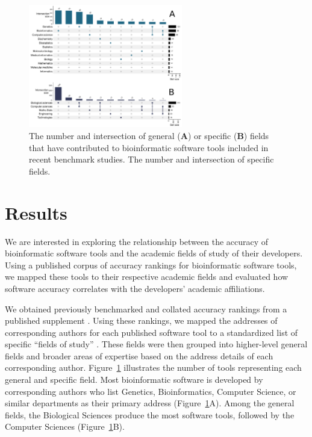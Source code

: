 \documentclass[fleqn,10pt,doc,onecolumn]{SelfArx}%
\begin{document}
\begin{figure}[ht!]
\begin{center}
  \includegraphics[width=0.6\textwidth]{upset-plots.pdf}
\end{center}
  \caption{ The number and intersection of general (\textbf{A}) or
  specific (\textbf{B}) fields that have contributed to bioinformatic
  software tools included in recent benchmark studies.  The number and
  intersection of specific fields.  }
\label{fig:fig1}
\end{figure}


\section*{Results}

We are interested in exploring the relationship between the accuracy
of bioinformatic software tools and the academic fields of study of
their developers. Using a published corpus of accuracy rankings
for bioinformatic software tools, we mapped these tools to their
respective academic fields and evaluated how software accuracy
correlates with the developers' academic affiliations.

We obtained previously benchmarked and collated accuracy rankings from
a published supplement \cite{gardner2024}. Using these rankings, we
mapped the addresses of corresponding authors for each published
software tool to a standardized list of specific ``fields of study''
\cite{fields2014}. These fields were then grouped into higher-level
general fields and broader areas of expertise based on the address
details of each corresponding author. Figure~\ref{fig:fig1} illustrates
the number of tools representing each general and specific field. Most
bioinformatic software is developed by corresponding authors who list
Genetics, Bioinformatics, Computer Science, or similar departments as
their primary address (Figure~\ref{fig:fig1}A). Among the general fields,
the Biological Sciences produce the most software tools, followed by
the Computer Sciences (Figure~\ref{fig:fig1}B).
\end{document}
